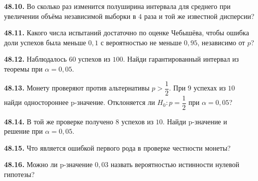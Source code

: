 \ifdim\dimexpr\ht\CatFlowBox+\dp\CatFlowBox\relax<64mm\dp\CatFlowBox=\dimexpr64mm-\ht\CatFlowBox\relax\fi%
\noindent\usebox{\CatFlowBox}\par\addvspace{5pt}

\noindent\begin{minipage}[t]{\linewidth}\textbf{48.10.} Во сколько раз изменится полуширина интервала для среднего при увеличении объёма независимой выборки в \(4\) раза и той же известной дисперсии?\par\end{minipage}\par
\noindent\begin{minipage}[t]{\linewidth}\textbf{48.11.} Какого числа испытаний достаточно по оценке Чебышёва, чтобы ошибка доли успехов была меньше \(0{,}1\) с вероятностью не меньше \(0{,}95\), независимо от \(p\)?\par\end{minipage}\par
\noindent\begin{minipage}[t]{\linewidth}\textbf{48.12.} Наблюдалось \(60\) успехов из \(100\). Найди гарантированный интервал из теоремы при \(\alpha=0{,}05\).\par\end{minipage}\par
\noindent\begin{minipage}[t]{\linewidth}\textbf{48.13.} Монету проверяют против альтернативы \(p>\dfrac12\). При \(9\) успехах из \(10\) найди одностороннее p-значение. Отклоняется ли \(H_0:p=\dfrac12\) при \(\alpha=0{,}05\)?\par\end{minipage}\par
\noindent\begin{minipage}[t]{\linewidth}\textbf{48.14.} В той же проверке получено \(8\) успехов из \(10\). Найди p-значение и решение при \(\alpha=0{,}05\).\par\end{minipage}\par
\noindent\begin{minipage}[t]{\linewidth}\textbf{48.15.} Что является ошибкой первого рода в проверке честности монеты?\par\end{minipage}\par
\noindent\begin{minipage}[t]{\linewidth}\textbf{48.16.} Можно ли p-значение \(0{,}03\) назвать вероятностью истинности нулевой гипотезы?\par\end{minipage}\par
